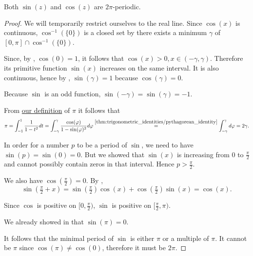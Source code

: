 \begin{theorem}\label{thm:trigonometric_function_period}
  Both \( \sin(z) \) and \( \cos(z) \) are \( 2\pi \)-periodic.
\end{theorem}
\begin{proof}
  We will temporarily restrict ourselves to the real line. Since \( \cos(x) \) is continuous, \( \cos^{-1}(\{ 0 \}) \) is a closed set by  there exists a minimum \( \gamma \) of \( [0, \pi] \cap \cos^{-1}(\{ 0 \}) \).

  Since, by , \( \cos(0) = 1 \), it follows that \( \cos(x) > 0, x \in (-\gamma, \gamma) \). Therefore its primitive function \( \sin(x) \) increases on the same interval. It is also continuous, hence by , \( \sin(\gamma) = 1 \) because \( \cos(\gamma) = 0 \).

  Because \( \sin \) is an odd function, \( \sin(-\gamma) = \sin(\gamma) = -1 \).

  From \hyperref[def:pi]{our definition} of \( \pi \) it follows that
  \begin{equation*}
    \pi
    =
    \int_{-1}^1 \frac 1 {1 - t^2} dt
    =
    \int_{-\gamma}^\gamma \frac {\cos(\varphi)} {1 - \sin(\varphi)^2} d\varphi
    \overset {\ref{thm:trigonometric_identities/pythagorean_identity}} =
    \int_{-\gamma}^\gamma d\varphi
    =
    2\gamma.
  \end{equation*}

  In order for a number \( p \) to be a period of \( \sin \), we need to have \( \sin(p) = \sin(0) = 0 \). But we showed that \( \sin(x) \) is increasing from \( 0 \) to \( \tfrac \pi 2 \) and cannot possibly contain zeros in that interval. Hence \( p > \tfrac \pi 2 \).

  We also have \( \cos(\tfrac \pi 2) = 0 \). By ,
  \begin{equation*}
    \sin(\tfrac \pi 2 + x)
    =
    \sin(\tfrac \pi 2) \cos(x) + \cos(\tfrac \pi 2) \sin(x)
    =
    \cos(x).
  \end{equation*}

  Since \( \cos \) is positive on \( [0, \tfrac \pi 2) \), \( \sin \) is positive on \( [\tfrac \pi 2, \pi) \).

  We already showed in  that \( \sin(\pi) = 0 \).

  It follows that the minimal period of \( \sin \) is either \( \pi \) or a multiple of \( \pi \). It cannot be \( \pi \) since \( \cos(\pi) \neq \cos(0) \), therefore it must be \( 2\pi \).
\end{proof}


